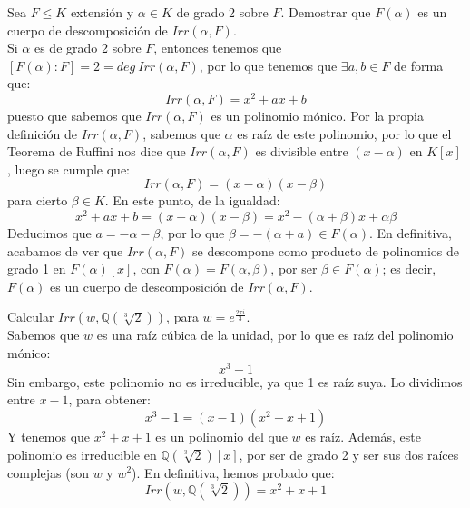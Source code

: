 \begin{ejercicio}
    Sea $F\leq K$ extensión y $\alpha\in K$ de grado 2 sobre $F$. Demostrar que $F(\alpha)$ es un cuerpo de descomposición de $Irr(\alpha,F)$.\\

    \noindent
    Si $\alpha$ es de grado 2 sobre $F$, entonces tenemos que $[F(\alpha):F] = 2 = deg~Irr(\alpha,F)$, por lo que tenemos que $\exists a,b\in F$ de forma que:
    \begin{equation*}
        Irr(\alpha,F) = x^2+ax+b
    \end{equation*}
    puesto que sabemos que $Irr(\alpha,F)$ es un polinomio mónico. Por la propia definición de $Irr(\alpha,F)$, sabemos que $\alpha$ es raíz de este polinomio, por lo que el Teorema de Ruffini nos dice que $Irr(\alpha,F)$ es divisible entre $(x-\alpha)$ en $K[x]$, luego se cumple que:
    \begin{equation*}
        Irr(\alpha,F) = (x-\alpha)(x-\beta)
    \end{equation*}
    para cierto $\beta\in K$. En este punto, de la igualdad:
    \begin{equation*}
        x^2+ax+b = (x-\alpha)(x-\beta) = x^2-(\alpha+\beta)x + \alpha\beta
    \end{equation*}
    Deducimos que $a=-\alpha-\beta$, por lo que $\beta=-(\alpha+a)\in F(\alpha)$. En definitiva, acabamos de ver que $Irr(\alpha,F)$ se descompone como producto de polinomios de grado 1 en $F(\alpha)[x]$, con $F(\alpha) = F(\alpha,\beta)$, por ser $\beta\in F(\alpha)$; es decir, $F(\alpha)$ es un cuerpo de descomposición de $Irr(\alpha,F)$.
\end{ejercicio}

\begin{ejercicio}
    Calcular $Irr\left(w,\mathbb{Q}\left(\sqrt[3]{2}\right)\right)$, para $w=e^{\frac{2\pi i}{3}}$.\\

    \noindent
    Sabemos que $w$ es una raíz cúbica de la unidad, por lo que es raíz del polinomio mónico:
    \begin{equation*}
        x^3-1
    \end{equation*}
    Sin embargo, este polinomio no es irreducible, ya que 1 es raíz suya. Lo dividimos entre $x-1$, para obtener:
    \begin{equation*}
        x^3-1 = (x-1)(x^2+x+1)
    \end{equation*}
    Y tenemos que $x^2+x+1$ es un polinomio del que $w$ es raíz. Además, este polinomio es irreducible en $\mathbb{Q}\left(\sqrt[3]{2}\right)[x]$, por ser de grado 2 y ser sus dos raíces complejas (son $w$ y $w^2$). En definitiva, hemos probado que:
    \begin{equation*}
        Irr\left(w,\mathbb{Q}\left(\sqrt[3]{2}\right)\right) = x^2+x+1
    \end{equation*}
\end{ejercicio}

